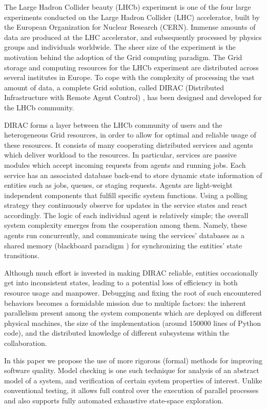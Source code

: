 \documentclass{IEEEtran}
\begin{document}
The Large Hadron Collider beauty (LHCb) experiment \cite{LHCb} is one of
the four large experiments conducted on the Large Hadron Collider (LHC)
accelerator, built by the European Organization for Nuclear Research
(CERN). Immense amounts of data are produced at the LHC accelerator, and
subsequently processed by physics groups and individuals worldwide. The
sheer size of the experiment is the motivation behind the adoption of
the Grid computing paradigm. The Grid storage and computing resources
for the LHCb experiment are distributed across several institutes in
Europe. To cope with the complexity of processing the vast amount of
data, a complete Grid solution, called DIRAC (Distributed Infrastructure
with Remote Agent Control) \cite{Tsa+:07,ST:07}, has been designed and
developed for the LHCb community.

DIRAC forms a layer between the LHCb community of users and the
heterogeneous Grid resources, in order to allow for optimal and reliable
usage of these resources. It consists of many cooperating distributed
services and agents which deliver workload to the resources. In
particular, services are passive modules which accept incoming requests
from agents and running jobs. Each service has an associated database
back-end to store dynamic state information of entities such as jobs,
queues, or staging requests. Agents are light-weight independent
components that fulfill specific system functions. Using a polling
strategy they continuously observe for updates in the service states
and react accordingly. The logic of each individual agent is relatively
simple; the overall system complexity emerges from the cooperation among
them. Namely, these agents run concurrently, and communicate using
the services' databases as a shared memory (blackboard paradigm \cite{McMB:96})
for synchronizing the entities’ state transitions.  

Although much effort is invested in making DIRAC reliable, entities
occasionally get into inconsistent states, leading to a potential loss
of efficiency in both resource usage and manpower. Debugging and fixing
the root of such encountered behaviors becomes a formidable mission due
to multiple factors: the inherent parallelism present among the system
components which are deployed on different physical machines, the size
of the implementation (around 150000 lines of Python code), and the
distributed knowledge of different subsystems within the collaboration.

In this paper we propose the use of more rigorous (formal) methods
for improving software quality. Model checking \cite{GW:05} is one such
technique for analysis of an abstract model of a system, and verification
of certain system properties of interest. Unlike conventional testing,
it allows full control over the execution of parallel processes and also
supports fully automated exhaustive state-space exploration.
\end{document}
